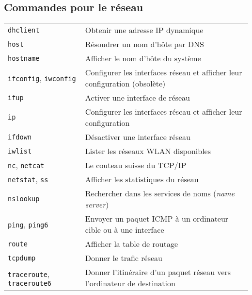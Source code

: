 \documentclass[10pt,a4paper]{article}
\begin{document}
\begin{multicols}{2}

\section{Commandes pour le réseau}
\begin{tabular}{ p{2.5cm} p{8.5cm} }
  \hline
  \texttt{dhclient} & Obtenir une adresse IP dynamique \\
  \rowcolor{Gray}
  \texttt{host} & Résoudrer un nom d'hôte par DNS \\
  \texttt{hostname} & Afficher le nom d'hôte du système \\
  \rowcolor{Gray}
  \texttt{ifconfig}, \texttt{iwconfig} & Configurer les interfaces réseau et afficher leur confi\-guration (obsolète)\\
  \texttt{ifup} & Activer une interface de réseau\\
  \rowcolor{Gray}
  \texttt{ip} & Configurer les interfaces réseau et afficher leur confi\-guration\\
  \texttt{ifdown} & Désactiver une interface réseau \\
  \rowcolor{Gray}
  \texttt{iwlist} & Lister les réseaux WLAN disponibles\\
  \texttt{nc}, \texttt{netcat} & Le couteau suisse du TCP/IP \\
  \rowcolor{Gray}
  \texttt{netstat}, \texttt{ss} & Afficher les statistiques du réseau \\
  \texttt{nslookup} & Rechercher dans les services de noms (\textit{name server}) \\
  \rowcolor{Gray}
  \texttt{ping}, \texttt{ping6} & Envoyer un paquet ICMP à un ordinateur cible ou à une interface\\
  \texttt{route} & Afficher la table de routage \\
  \rowcolor{Gray}
  \texttt{tcpdump} & Donner le trafic réseau \\
  \texttt{traceroute}, \texttt{traceroute6} & Donner l'itinéraire d'un paquet réseau vers \newline l'ordinateur de destination \\
  \hline
\end{tabular}

\hfill
~ \\
~ \\
~ \\


\end{multicols}
\end{document}
